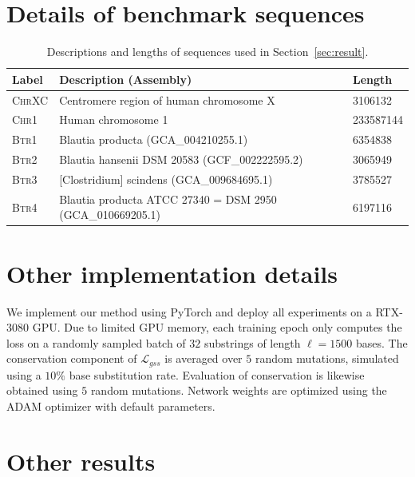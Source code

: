 \section{Details of benchmark sequences}
\label{app-mask:d}
\setlength{\tabcolsep}{12pt}
\begin{table}[h]
\begin{center}
\begin{tabular}{lll} 
    \toprule
    Label & Description (Assembly) & Length \\
    \midrule
    \textsc{ChrXC} & Centromere region of human chromosome X \cite{miga19} & 3106132 \\ 
    \textsc{Chr1} & Human chromosome 1 & 233587144 \\ 
    \textsc{Btr1} & Blautia producta (GCA\_004210255.1) & 6354838 \\ 
    \textsc{Btr2} & Blautia hansenii DSM 20583 (GCF\_002222595.2) & 3065949 \\ 
    \textsc{Btr3} & [Clostridium] scindens (GCA\_009684695.1) & 3785527 \\ 
    \textsc{Btr4} & Blautia producta ATCC 27340 = DSM 2950 (GCA\_010669205.1) & 6197116 \\ 
    \bottomrule
\end{tabular}
\end{center}
\caption{Descriptions and lengths of sequences used in Section~\ref{sec:result}.}
\label{table:4}
\end{table}

\section{Other implementation details}
\label{app-mask:e}
We implement our method using PyTorch and deploy all experiments on a
RTX-3080 GPU. Due to limited GPU memory, each training epoch only computes the loss on a randomly sampled batch of $32$ substrings of length $\ell = 1500$ bases. The conservation component of $\mathcal{L}_{gss}$ is averaged over $5$ random mutations, simulated using a $10\%$ base substitution rate. Evaluation of conservation is likewise obtained using $5$ random mutations. Network weights are optimized using the ADAM optimizer \cite{kingma14adam} with default parameters.

\section{Other results}
\label{app-mask:f}
